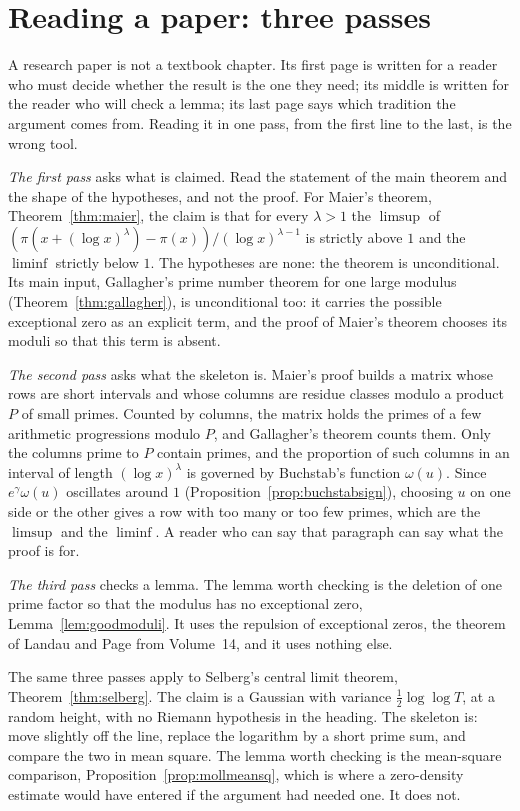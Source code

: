 \section{Reading a paper: three passes}\label{sec:threepasses}

A research paper is not a textbook chapter. Its first page is written for a reader who must decide whether the result is the one they need; its middle is written for the reader who will check a lemma; its last page says which tradition the argument comes from. Reading it in one pass, from the first line to the last, is the wrong tool.

\emph{The first pass} asks what is claimed. Read the statement of the main theorem and the shape of the hypotheses, and not the proof. For Maier's theorem, Theorem~\ref{thm:maier}, the claim is that for every $\lambda>1$ the $\limsup$ of $(\pi(x+(\log x)^\lambda)-\pi(x))/(\log x)^{\lambda-1}$ is strictly above $1$ and the $\liminf$ strictly below $1$. The hypotheses are none: the theorem is unconditional. Its main input, Gallagher's prime number theorem for one large modulus (Theorem~\ref{thm:gallagher}), is unconditional too: it carries the possible exceptional zero as an explicit term, and the proof of Maier's theorem chooses its moduli so that this term is absent.

\emph{The second pass} asks what the skeleton is. Maier's proof builds a matrix whose rows are short intervals and whose columns are residue classes modulo a product $P$ of small primes. Counted by columns, the matrix holds the primes of a few arithmetic progressions modulo $P$, and Gallagher's theorem counts them. Only the columns prime to $P$ contain primes, and the proportion of such columns in an interval of length $(\log x)^\lambda$ is governed by Buchstab's function $\omega(u)$. Since $e^\gamma\omega(u)$ oscillates around $1$ (Proposition~\ref{prop:buchstabsign}), choosing $u$ on one side or the other gives a row with too many or too few primes, which are the $\limsup$ and the $\liminf$. A reader who can say that paragraph can say what the proof is for.

\emph{The third pass} checks a lemma. The lemma worth checking is the deletion of one prime factor so that the modulus has no exceptional zero, Lemma~\ref{lem:goodmoduli}. It uses the repulsion of exceptional zeros, the theorem of Landau and Page from Volume~14, and it uses nothing else.

The same three passes apply to Selberg's central limit theorem, Theorem~\ref{thm:selberg}. The claim is a Gaussian with variance $\frac12\log\log T$, at a random height, with no Riemann hypothesis in the heading. The skeleton is: move slightly off the line, replace the logarithm by a short prime sum, and compare the two in mean square. The lemma worth checking is the mean-square comparison, Proposition~\ref{prop:mollmeansq}, which is where a zero-density estimate would have entered if the argument had needed one. It does not.

